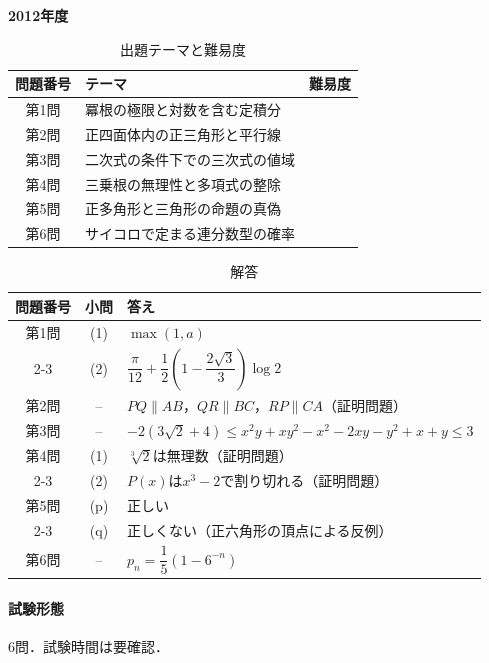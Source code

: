 \documentclass[../../main.tex]{subfiles}
\begin{document}
\begin{center}
  {\fontsize{48pt}{58pt}\selectfont \textbf{2012}\normalsize\textbf{年度}}
\end{center}

\begin{table}[htb]
  \centering
  \caption{出題テーマと難易度}
  \begin{tabular}{|c|p{9cm}|c|}
    \hline
    \textbf{問題番号} & \textbf{テーマ} & \textbf{難易度} \\
    \hline
    第1問 & 冪根の極限と対数を含む定積分 & \\
    \hline
    第2問 & 正四面体内の正三角形と平行線 & \\
    \hline
    第3問 & 二次式の条件下での三次式の値域 & \\
    \hline
    第4問 & 三乗根の無理性と多項式の整除 & \\
    \hline
    第5問 & 正多角形と三角形の命題の真偽 & \\
    \hline
    第6問 & サイコロで定まる連分数型の確率 & \\
    \hline
  \end{tabular}
\end{table}

\begin{table}[htb]
  \centering
  \caption{解答}
  \renewcommand{\arraystretch}{1.4}
  \begin{tabular}{|c|c|p{9cm}|}
    \hline
    \textbf{問題番号} & \textbf{小問} & \textbf{答え} \\
    \hline
    第1問 & (1) & $\max(1,a)$ \\
    \cline{2-3}
    & (2) & $\dfrac{\pi}{12}+\dfrac{1}{2}\left(1-\dfrac{2\sqrt{3}}{3}\right)\log2$ \\
    \hline
    第2問 & -- & $PQ\parallel AB$，$QR\parallel BC$，$RP\parallel CA$（証明問題） \\
    \hline
    第3問 & -- & $-2(3\sqrt{2}+4)\le x^2y+xy^2-x^2-2xy-y^2+x+y\le3$ \\
    \hline
    第4問 & (1) & $\sqrt[3]{2}$は無理数（証明問題） \\
    \cline{2-3}
    & (2) & $P(x)$は$x^3-2$で割り切れる（証明問題） \\
    \hline
    第5問 & (p) & 正しい \\
    \cline{2-3}
    & (q) & 正しくない（正六角形の頂点による反例） \\
    \hline
    第6問 & -- & $p_n=\dfrac{1}{5}\left(1-6^{-n}\right)$ \\
    \hline
  \end{tabular}
\end{table}

\paragraph{試験形態}
6問．試験時間は要確認．
\end{document}
